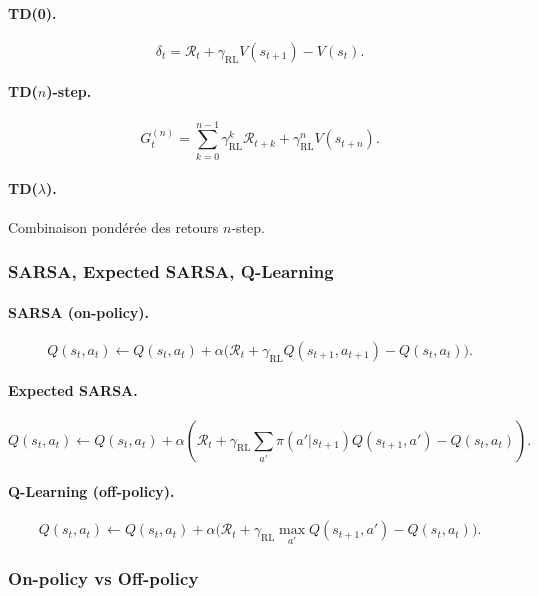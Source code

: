 \documentclass[11pt,a4paper]{article}
\newcommand{\1}{\mathbf{1}}
\begin{document}
\paragraph{TD(0).}
\[
\delta_t = \mathcal{R}_t + \gamma_{\mathrm{RL}} V(s_{t+1}) - V(s_t).
\]

\paragraph{TD($n$)-step.}
\[
G_t^{(n)} = \sum_{k=0}^{n-1} \gamma_{\mathrm{RL}}^k \mathcal{R}_{t+k} + \gamma_{\mathrm{RL}}^n V(s_{t+n}).
\]

\paragraph{TD($\lambda$).}
Combinaison pondérée des retours $n$-step.

\subsubsection{SARSA, Expected SARSA, Q-Learning}

\paragraph{SARSA (on-policy).}
\[
Q(s_t,a_t)
\leftarrow
Q(s_t,a_t)
+ \alpha
\bigl(
\mathcal{R}_t
+ \gamma_{\mathrm{RL}} Q(s_{t+1},a_{t+1})
- Q(s_t,a_t)
\bigr).
\]

\paragraph{Expected SARSA.}
\[
Q(s_t,a_t)
\leftarrow
Q(s_t,a_t)
+
\alpha\left(
\mathcal{R}_t + \gamma_{\mathrm{RL}} \sum_{a'} \pi(a'|s_{t+1}) Q(s_{t+1},a')
- Q(s_t,a_t)
\right).
\]

\paragraph{Q-Learning (off-policy).}
\[
Q(s_t,a_t)
\leftarrow
Q(s_t,a_t)
+
\alpha\bigl(
\mathcal{R}_t
+ \gamma_{\mathrm{RL}} \max_{a'} Q(s_{t+1},a')
- Q(s_t,a_t)
\bigr).
\]

\subsubsection{On-policy vs Off-policy}
\end{document}
